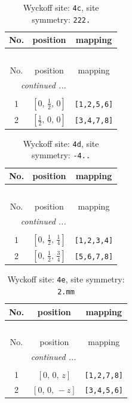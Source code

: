 \documentclass[fleqn,8pt]{jsarticle}
\begin{document}
\begin{longtable}{ccc}
\caption{Wyckoff site: {\tt 4c}, site symmetry: {\tt 222.}}
 \\
 \hline \hline
No. & position & mapping \\ \hline \endfirsthead

\multicolumn{2}{l}{\tablename\ \thetable{}} \\
 \hline \hline
No. & position & mapping \\ \hline \endhead

 \hline \hline
\multicolumn{2}{r}{\footnotesize\it continued ...} \\ \endfoot

 \hline \hline
\multicolumn{2}{r}{} \\ \endlastfoot

1 & $\left[ 0,\, \frac{1}{2},\, 0 \right]$ & {\tt [1,2,5,6]} \\ \hline
2 & $\left[ \frac{1}{2},\, 0,\, 0 \right]$ & {\tt [3,4,7,8]} \\
\end{longtable}
\renewcommand{\arraystretch}{1.2}
\begin{longtable}{ccc}
\caption{Wyckoff site: {\tt 4d}, site symmetry: {\tt -4..}}
 \\
 \hline \hline
No. & position & mapping \\ \hline \endfirsthead

\multicolumn{2}{l}{\tablename\ \thetable{}} \\
 \hline \hline
No. & position & mapping \\ \hline \endhead

 \hline \hline
\multicolumn{2}{r}{\footnotesize\it continued ...} \\ \endfoot

 \hline \hline
\multicolumn{2}{r}{} \\ \endlastfoot

1 & $\left[ 0,\, \frac{1}{2},\, \frac{1}{4} \right]$ & {\tt [1,2,3,4]} \\ \hline
2 & $\left[ 0,\, \frac{1}{2},\, \frac{3}{4} \right]$ & {\tt [5,6,7,8]} \\
\end{longtable}
\renewcommand{\arraystretch}{1.2}
\begin{longtable}{ccc}
\caption{Wyckoff site: {\tt 4e}, site symmetry: {\tt 2.mm}}
 \\
 \hline \hline
No. & position & mapping \\ \hline \endfirsthead

\multicolumn{2}{l}{\tablename\ \thetable{}} \\
 \hline \hline
No. & position & mapping \\ \hline \endhead

 \hline \hline
\multicolumn{2}{r}{\footnotesize\it continued ...} \\ \endfoot

 \hline \hline
\multicolumn{2}{r}{} \\ \endlastfoot

1 & $\left[ 0,\, 0,\, z \right]$ & {\tt [1,2,7,8]} \\ \hline
2 & $\left[ 0,\, 0,\, - z \right]$ & {\tt [3,4,5,6]} \\
\end{longtable}
\end{document}
